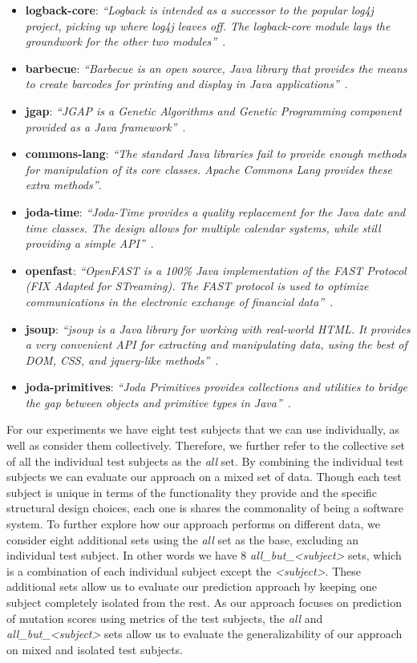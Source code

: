 \begin{itemize}
  \item \textbf{logback-core}: \emph{``Logback is intended as a successor to the popular log4j project, picking up where log4j leaves off. The logback-core module lays the groundwork for the other two modules''}~\cite{logback}.
  \item \textbf{barbecue}: \emph{``Barbecue is an open source, Java library that provides the means to create barcodes for printing and display in Java applications''}~\cite{barbecue}.
  \item \textbf{jgap}: \emph{``JGAP is a Genetic Algorithms and Genetic Programming component provided as a Java framework''}~\cite{jgap}.
  \item \textbf{commons-lang}: \emph{``The standard Java libraries fail to provide enough methods for manipulation of its core classes. Apache Commons Lang provides these extra methods''}\cite{commons-lang}.
  \item \textbf{joda-time}: \emph{``Joda-Time provides a quality replacement for the Java date and time classes. The design allows for multiple calendar systems, while still providing a simple API''}~\cite{joda-time}.
  \item \textbf{openfast}: \emph{``OpenFAST is a 100\% Java implementation of the FAST Protocol (FIX Adapted for STreaming). The FAST protocol is used to optimize communications in the electronic exchange of financial data''}~\cite{openfast}.
  \item \textbf{jsoup}: \emph{``jsoup is a Java library for working with real-world HTML. It provides a very convenient API for extracting and manipulating data, using the best of DOM, CSS, and jquery-like methods''}~\cite{jsoup}.
  \item \textbf{joda-primitives}: \emph{``Joda Primitives provides collections and utilities to bridge the gap between objects and primitive types in Java''}~\cite{joda-primitives}.
\end{itemize}

For our experiments we have eight test subjects that we can use individually, as well as consider them collectively. Therefore, we further refer to the collective set of all the individual test subjects as the \emph{all} set. By combining the individual test subjects we can evaluate our approach on a mixed set of data. Though each test subject is unique in terms of the functionality they provide and the specific structural design choices, each one is shares the commonality of being a software system. To further explore how our approach performs on different data, we consider eight additional sets using the \emph{all} set as the base, excluding an individual test subject. In other words we have 8 \emph{all\_but\_<subject>} sets, which is a combination of each individual subject except the \emph{<subject>}. These additional sets allow us to evaluate our prediction approach by keeping one subject completely isolated from the rest. As our approach focuses on prediction of mutation scores using metrics of the test subjects, the \emph{all} and \emph{all\_but\_<subject>} sets allow us to evaluate the generalizability of our approach on mixed and isolated test subjects.


